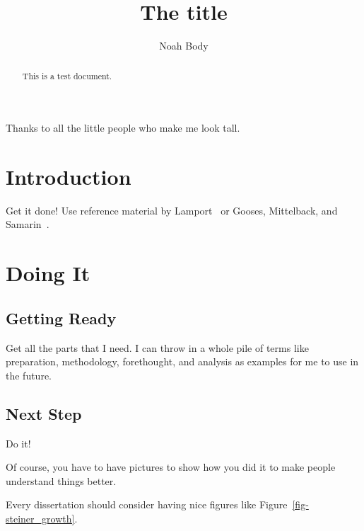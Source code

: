 \documentclass[12pt]{dalcsthesis}
\begin{document}
\mcs  %
\title{The title}
\author{Noah Body}



\nolistoftables
\nolistoffigures

\frontmatter

\begin{abstract}
This is a test document.
\end{abstract}

\begin{acknowledgements}
Thanks to all the little people who make me look tall.
\end{acknowledgements}

\mainmatter

\chapter{Introduction}

Get it done!  Use reference material by Lamport~\cite{latex-by-lamport} or
Gooses, Mittelback, and Samarin~\cite{latex-companion}.

\chapter{Doing It}

\section{Getting Ready}

Get all the parts that I need.  I can throw in a whole pile of terms like
preparation,
methodology,
forethought,
and
analysis
as examples for me to use in the future.

\section{Next Step}

Do it!

Of course, you have to have pictures to show how you did it to make people
understand things better.

Every dissertation should consider having nice figures like Figure~\ref{fig-steiner_growth}.
\end{document}
